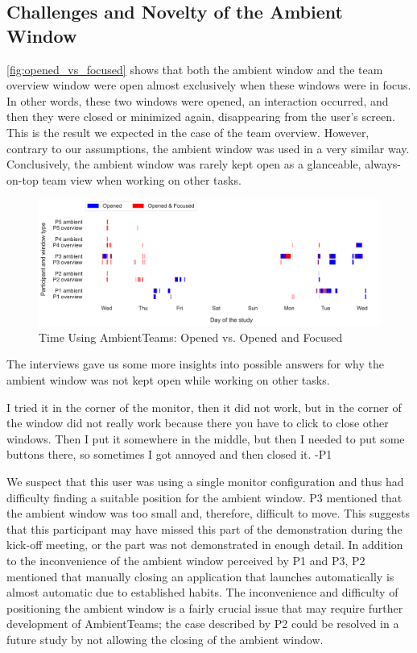 \subsection{Challenges and Novelty of the Ambient Window}
\autoref{fig:opened_vs_focused} shows that both the ambient window and the team overview window were open almost exclusively when these windows were in focus. In other words, these two windows were opened, an interaction occurred, and then they were closed or minimized again, disappearing from the user's screen. This is the result we expected in the case of the team overview. However, contrary to our assumptions, the ambient window was used in a very similar way. Conclusively, the ambient window was rarely kept open as a glanceable, always-on-top team view when working on other tasks.

\begin{figure}[h]
    \centering
    \includegraphics[width=\linewidth]{plots/open_vs_focus.pdf}
    \caption{Time Using AmbientTeams: Opened vs. Opened and Focused}
    \label{fig:opened_vs_focused}
\end{figure}

The interviews gave us some more insights into possible answers for why the ambient window was not kept open while working on other tasks.

\begin{displayquote}
    I tried it in the corner of the monitor, then it did not work, but in the corner of the window did not really work because there you have to click to close other windows. Then I put it somewhere in the middle, but then I needed to put some buttons there, so sometimes I got annoyed and then closed it. -P1
\end{displayquote}

We suspect that this user was using a single monitor configuration and thus had difficulty finding a suitable position for the ambient window. P3 mentioned that the ambient window was too small and, therefore, difficult to move. This suggests that this participant may have missed this part of the demonstration during the kick-off meeting, or the part was not demonstrated in enough detail. In addition to the inconvenience of the ambient window perceived by P1 and P3, P2 mentioned that manually closing an application that launches automatically is almost automatic due to established habits. The inconvenience and difficulty of positioning the ambient window is a fairly crucial issue that may require further development of AmbientTeams; the case described by P2 could be resolved in a future study by not allowing the closing of the ambient window.

